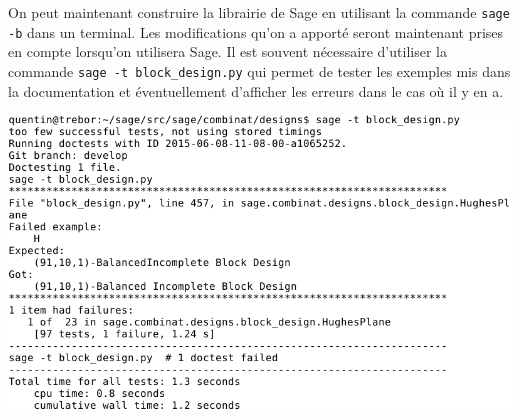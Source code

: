 \documentclass[a4paper]{article}
\begin{document}
\bigskip
  On peut maintenant construire la librairie de Sage en utilisant la commande \texttt{sage -b} dans un terminal. Les modifications qu'on a apporté seront maintenant prises en compte lorsqu'on utilisera Sage. Il est souvent nécessaire d'utiliser la commande \texttt{sage -t block\_design.py} qui permet de tester les exemples mis dans la documentation et éventuellement d'afficher les erreurs dans le cas où il y en a.
\begin{center}
 \includegraphics[scale=0.7]{hugheserror.png}
\end{center}






\newpage
\end{document}
